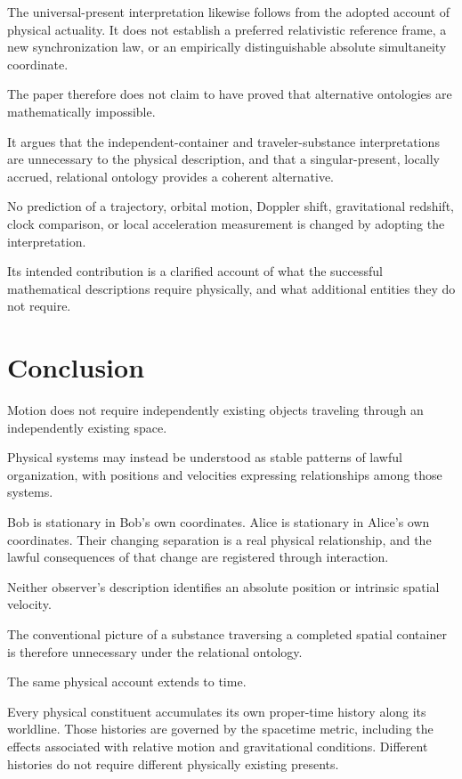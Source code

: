 \documentclass[12pt,onecolumn]{article}
\begin{document}
The universal-present interpretation likewise follows from the adopted account of physical actuality. It does not establish a preferred relativistic reference frame, a new synchronization law, or an empirically distinguishable absolute simultaneity coordinate.

The paper therefore does not claim to have proved that alternative ontologies are mathematically impossible.

It argues that the independent-container and traveler-substance interpretations are unnecessary to the physical description, and that a singular-present, locally accrued, relational ontology provides a coherent alternative.

No prediction of a trajectory, orbital motion, Doppler shift, gravitational redshift, clock comparison, or local acceleration measurement is changed by adopting the interpretation.

Its intended contribution is a clarified account of what the successful mathematical descriptions require physically, and what additional entities they do not require.

\section{Conclusion}

Motion does not require independently existing objects traveling through an independently existing space.

Physical systems may instead be understood as stable patterns of lawful organization, with positions and velocities expressing relationships among those systems.

Bob is stationary in Bob's own coordinates. Alice is stationary in Alice's own coordinates. Their changing separation is a real physical relationship, and the lawful consequences of that change are registered through interaction.

Neither observer's description identifies an absolute position or intrinsic spatial velocity.

The conventional picture of a substance traversing a completed spatial container is therefore unnecessary under the relational ontology.

The same physical account extends to time.

Every physical constituent accumulates its own proper-time history along its worldline. Those histories are governed by the spacetime metric, including the effects associated with relative motion and gravitational conditions. Different histories do not require different physically existing presents.
\end{document}
